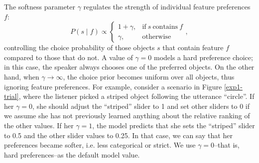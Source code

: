 \documentclass[10pt,a4paper]{article}
\begin{document}
The softness parameter $\gamma$ regulates the strength of individual feature preferences $f$:
\begin{equation}
P(s \mid f) \propto \begin{cases}
1 + \gamma, & \text{if}\ s\ \text{contains}\ f \\
\gamma, & \text{otherwise}
\end{cases},
\end{equation}
controlling the choice probability of those objects $s$ that contain feature $f$ compared to those that do not.  
A value of $\gamma=0$ models a hard preference choice; in this case, the speaker always chooses one of the preferred objects. 
On the other hand, when $\gamma \rightarrow \infty$, the choice prior becomes uniform over all objects, thus ignoring feature preferences. 
For example, consider a scenario in Figure \ref{exp1-trial}, where the listener picked a striped object following the utterance ``circle''. If her $\gamma=0$, she should adjust the ``striped'' slider to 1 and set other sliders to 0 if we assume she has not previously learned anything about the relative ranking of the other values. If her $\gamma=1$, the model predicts that she sets the ``striped'' slider to 0.5 and the other slider values to 0.25. In that case, we can say that her preferences became softer, i.e. less categorical or strict.
% 
We use $\gamma=0$--that is, hard preferences--as the default model value.
\end{document}
